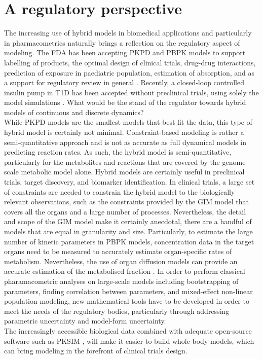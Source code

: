 \section{A regulatory perspective}
The increasing use of hybrid models in biomedical applications and particularly in pharmacometrics naturally brings a reflection on the regulatory aspect of modeling. The FDA has been accepting PKPD and PBPK models \cite{us2004innovation} to support labelling of products, the optimal design of clinical trials, drug-drug interactions, prediction of exposure in paediatric population, estimation of absorption, and as a support for regulatory review in general \cite{sager2015physiologically,pan2014application}. Recently, a closed-loop controlled insulin pump in T1D has been accepted without preclinical trials, using solely the model simulations \cite{kovatchev2009silico}. What would be the stand of the regulator towards hybrid models of continuous and discrete dynamics?\\
While PKPD models are the smallest models that best fit the data, this type of hybrid model is certainly not minimal. Constraint-based modeling is rather a semi-quantitative approach and is not as accurate as full dynamical models in predicting reaction rates. As such, the hybrid model is semi-quantitative, particularly for the metabolites and reactions that are covered by the genome-scale metabolic model alone. Hybrid models are certainly useful in preclinical trials, target discovery, and biomarker identification. In clinical trials, a large set of constraints are needed to constrain the hybrid model to the biologically relevant observations, such as the constraints provided by the GIM model that covers all the organs and a large number of processes. Nevertheless, the detail and scope of the GIM model make it certainly anecdotal, there are a handful of models that are equal in granularity and size. Particularly, to estimate the large number of kinetic parameters in PBPK models, concentration data in the target organs need to be measured to accurately estimate organ-specific rates of metabolism. Nevertheless, the use of organ diffusion models can provide an accurate estimation of the metabolised fraction \cite{rodgers2005physiologically,rodgers2006physiologically}. In order to perform classical pharamacometric analyses on large-scale models including bootstrapping of parameters, finding correlation between parameters, and mixed-effect non-linear population modeling, new mathematical tools have to be developed in order to meet the needs of the regulatory bodies, particularly through addressing parametric uncertainty and model-form uncertainty.\\
The increasingly accessible biological data combined with adequate open-source software such as PKSIM \cite{willmann2003pk}, will make it easier to build whole-body models, which can bring modeling in the forefront of clinical trials design.

